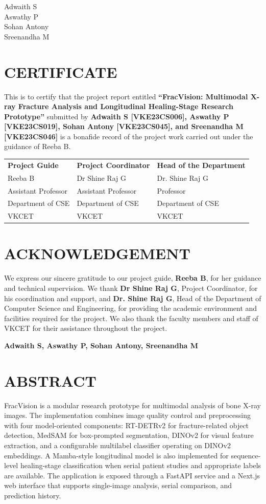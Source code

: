 \documentclass[12pt,a4paper]{article}
\begin{document}
\vspace{18pt}
\hfill Adwaith S\\
\hfill Aswathy P\\
\hfill Sohan Antony\\
\hfill Sreenandha M

\newpage
\section*{CERTIFICATE}
This is to certify that the project report entitled \textbf{“FracVision: Multimodal X-ray Fracture Analysis and Longitudinal Healing-Stage Research Prototype”} submitted by \textbf{Adwaith S [VKE23CS006], Aswathy P [VKE23CS019], Sohan Antony [VKE23CS045], and Sreenandha M [VKE23CS046]} is a bonafide record of the project work carried out under the guidance of Reeba B.

\vspace{25pt}
\begin{tabularx}{\textwidth}{XXX}
\textbf{Project Guide} & \textbf{Project Coordinator} & \textbf{Head of the Department}\\[8pt]
Reeba B & Dr Shine Raj G & Dr. Shine Raj G\\
Assistant Professor & Assistant Professor & Professor\\
Department of CSE & Department of CSE & Department of CSE\\
VKCET & VKCET & VKCET
\end{tabularx}

\newpage
\section*{ACKNOWLEDGEMENT}
We express our sincere gratitude to our project guide, \textbf{Reeba B}, for her guidance and technical supervision. We thank \textbf{Dr Shine Raj G}, Project Coordinator, for his coordination and support, and \textbf{Dr. Shine Raj G}, Head of the Department of Computer Science and Engineering, for providing the academic environment and facilities required for the project. We also thank the faculty members and staff of VKCET for their assistance throughout the project.

\vspace{18pt}
\hfill \textbf{Adwaith S, Aswathy P, Sohan Antony, Sreenandha M}

\newpage
\section*{ABSTRACT}
FracVision is a modular research prototype for multimodal analysis of bone X-ray images. The implementation combines image quality control and preprocessing with four model-oriented components: RT-DETRv2 for fracture-related object detection, MedSAM for box-prompted segmentation, DINOv2 for visual feature extraction, and a configurable multilabel classifier operating on DINOv2 embeddings. A Mamba-style longitudinal model is also implemented for sequence-level healing-stage classification when serial patient studies and appropriate labels are available. The application is exposed through a FastAPI service and a Next.js web interface that supports single-image analysis, serial comparison, and prediction history.
\end{document}
